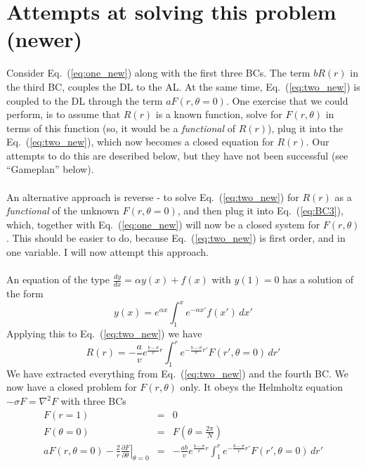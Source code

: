\documentclass{article}
\begin{document}
\section{Attempts at solving this problem (newer)}
\noindent Consider Eq.~(\ref{eq:one_new}) along with the first three BCs.  The term $b R(r)$ in the third BC, couples the DL to the AL.  At the same time, Eq.~(\ref{eq:two_new}) is coupled to the DL through the term $aF(r,\theta=0)$.  One exercise that we could perform, is to assume that $R(r)$ is a known function, solve for $F(r,\theta)$ in terms of this function (so, it would be a \emph{functional} of $R(r)$), plug it into the Eq.~(\ref{eq:two_new}), which now becomes a closed equation for $R(r)$.  Our attempts to do this are described below, but they have not been successful (see ``Gameplan'' below).
\\
\\
An alternative approach is reverse - to solve Eq.~(\ref{eq:two_new}) for $R(r)$ as a \emph{functional} of the unknown $F(r,\theta=0)$, and then plug it into Eq.~(\ref{eq:BC3}), which, together with Eq.~(\ref{eq:one_new}) will now be a closed system for $F(r,\theta)$.  This should be easier to do, because Eq.~(\ref{eq:two_new}) is first order, and in one variable.  I will now attempt this approach.
\\
\\
An equation of the type $\frac{dy}{dx} = \alpha y(x) + f(x)$ with $y(1)=0$ has a solution of the form
\begin{displaymath}
y(x) = e^{\alpha x}\int_1^x e^{-\alpha x'} f(x') \,dx'
\end{displaymath}
Applying this to Eq.~(\ref{eq:two_new}) we have
\begin{displaymath}
R(r) = -\frac{a}{v}e^{\frac{b-\sigma}{v} r}\int_1^r e^{-\frac{b-\sigma}{v} r'} F(r',\theta=0) \,dr'
\end{displaymath}
We have extracted everything from Eq.~(\ref{eq:two_new}) and the fourth BC.  We now have a closed problem for $F(r,\theta)$ only.  It obeys the Helmholtz equation $-\sigma F = \nabla^2 F$ with three BCs
\begin{eqnarray}
\label{eq:bc1} F(r=1) &=& 0  \\
\label{eq:bc2} F(\theta=0) &=& F(\theta = \frac{2\pi}{N})  \\
\label{eq:bc3} a F(r,\theta=0) - \frac{2}{r} \left.\frac{\partial F}{\partial \theta} \right|_{\theta=0} &=& -\frac{ab}{v}e^{\frac{b-\sigma}{v} r}\int_1^r e^{-\frac{b-\sigma}{v} r'} F(r',\theta=0) \,dr' 
\end{eqnarray}
\end{document}
